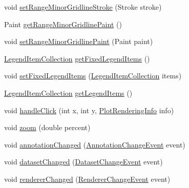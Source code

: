 \begin{DoxyCompactItemize}
void \mbox{\hyperlink{classorg_1_1jfree_1_1chart_1_1plot_1_1_category_plot_a8ce4e87387bbf647f4c04f8d8c01998e}{set\+Range\+Minor\+Gridline\+Stroke}} (Stroke stroke)
\item 
Paint \mbox{\hyperlink{classorg_1_1jfree_1_1chart_1_1plot_1_1_category_plot_a8674b0eb62f825645f314351468d24c1}{get\+Range\+Minor\+Gridline\+Paint}} ()
\item 
void \mbox{\hyperlink{classorg_1_1jfree_1_1chart_1_1plot_1_1_category_plot_ab73c99285bb575885f993a91f32d25b9}{set\+Range\+Minor\+Gridline\+Paint}} (Paint paint)
\item 
\mbox{\hyperlink{classorg_1_1jfree_1_1chart_1_1_legend_item_collection}{Legend\+Item\+Collection}} \mbox{\hyperlink{classorg_1_1jfree_1_1chart_1_1plot_1_1_category_plot_a46c3a569343408d1e941b99d9659b04d}{get\+Fixed\+Legend\+Items}} ()
\item 
void \mbox{\hyperlink{classorg_1_1jfree_1_1chart_1_1plot_1_1_category_plot_aa99f3c4dfdb16a776daf58d0b6043cd4}{set\+Fixed\+Legend\+Items}} (\mbox{\hyperlink{classorg_1_1jfree_1_1chart_1_1_legend_item_collection}{Legend\+Item\+Collection}} items)
\item 
\mbox{\hyperlink{classorg_1_1jfree_1_1chart_1_1_legend_item_collection}{Legend\+Item\+Collection}} \mbox{\hyperlink{classorg_1_1jfree_1_1chart_1_1plot_1_1_category_plot_a35e0a11b3c2ec63f53262b47ab80abbe}{get\+Legend\+Items}} ()
\item 
void \mbox{\hyperlink{classorg_1_1jfree_1_1chart_1_1plot_1_1_category_plot_a465ed8b225cbd808bf9cdc0a6203e82d}{handle\+Click}} (int x, int y, \mbox{\hyperlink{classorg_1_1jfree_1_1chart_1_1plot_1_1_plot_rendering_info}{Plot\+Rendering\+Info}} info)
\item 
void \mbox{\hyperlink{classorg_1_1jfree_1_1chart_1_1plot_1_1_category_plot_a0d3da3ceff2de768f55d5fbc626c1c46}{zoom}} (double percent)
\item 
void \mbox{\hyperlink{classorg_1_1jfree_1_1chart_1_1plot_1_1_category_plot_abd481802f87f149a798351cf99c7944f}{annotation\+Changed}} (\mbox{\hyperlink{classorg_1_1jfree_1_1chart_1_1event_1_1_annotation_change_event}{Annotation\+Change\+Event}} event)
\item 
void \mbox{\hyperlink{classorg_1_1jfree_1_1chart_1_1plot_1_1_category_plot_a18c1d4bbfe9b7646dc1e51246e5c11ff}{dataset\+Changed}} (\mbox{\hyperlink{classorg_1_1jfree_1_1data_1_1general_1_1_dataset_change_event}{Dataset\+Change\+Event}} event)
\item 
void \mbox{\hyperlink{classorg_1_1jfree_1_1chart_1_1plot_1_1_category_plot_aa6fdcb1c98c07059522ece57a89b37b8}{renderer\+Changed}} (\mbox{\hyperlink{classorg_1_1jfree_1_1chart_1_1event_1_1_renderer_change_event}{Renderer\+Change\+Event}} event)

\end{DoxyCompactItemize}
